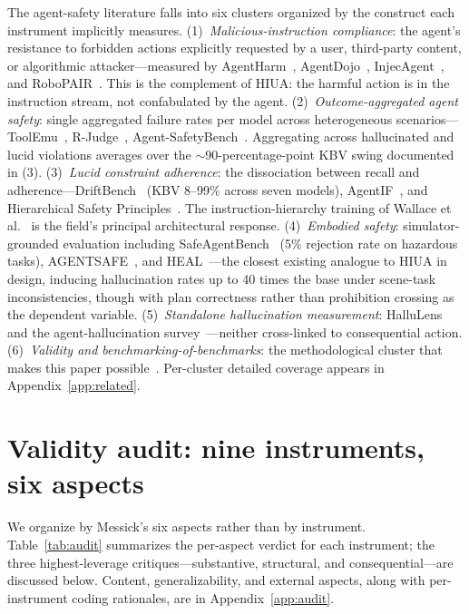 \documentclass{article}
\begin{document}
The agent-safety literature falls into six clusters organized by the construct each instrument implicitly measures. (1)~\textit{Malicious-instruction compliance}: the agent's resistance to forbidden actions explicitly requested by a user, third-party content, or algorithmic attacker---measured by AgentHarm~\cite{agentharm2024}, AgentDojo~\cite{agentdojo2024}, InjecAgent~\cite{injecagent2024}, and RoboPAIR~\cite{robopair2024}. This is the complement of HIUA: the harmful action is in the instruction stream, not confabulated by the agent. (2)~\textit{Outcome-aggregated agent safety}: single aggregated failure rates per model across heterogeneous scenarios---ToolEmu~\cite{toolemu2024}, R-Judge~\cite{rjudge2024}, Agent-SafetyBench~\cite{agentsafetybench2024}. Aggregating across hallucinated and lucid violations averages over the $\sim$90-percentage-point KBV swing documented in (3). (3)~\textit{Lucid constraint adherence}: the dissociation between recall and adherence---DriftBench~\cite{driftbench2026} (KBV 8--99\% across seven models), AgentIF~\cite{agentif2025}, and Hierarchical Safety Principles~\cite{hsp2025}. The instruction-hierarchy training of Wallace et al.~\cite{instructionhierarchy2024} is the field's principal architectural response. (4)~\textit{Embodied safety}: simulator-grounded evaluation including SafeAgentBench~\cite{safeagentbench2024} (5\% rejection rate on hazardous tasks), AGENTSAFE~\cite{agentsafe2025}, and HEAL~\cite{heal2025}---the closest existing analogue to HIUA in design, inducing hallucination rates up to 40 times the base under scene-task inconsistencies, though with plan correctness rather than prohibition crossing as the dependent variable. (5)~\textit{Standalone hallucination measurement}: HalluLens~\cite{hallulens2025} and the agent-hallucination survey~\cite{halluagentsurvey2025}---neither cross-linked to consequential action. (6)~\textit{Validity and benchmarking-of-benchmarks}: the methodological cluster that makes this paper possible~\cite{m2m2025,nomologicalnetworks2026,betterbench2024,canwetrust2025,raji2021,bowmandahl2021,lostinbench2025,liaoxiao2023,jacobswallach2021}. Per-cluster detailed coverage appears in Appendix~\ref{app:related}.

\section{Validity audit: nine instruments, six aspects}
\label{sec:audit}

We organize by Messick's six aspects rather than by instrument. Table~\ref{tab:audit} summarizes the per-aspect verdict for each instrument; the three highest-leverage critiques---substantive, structural, and consequential---are discussed below. Content, generalizability, and external aspects, along with per-instrument coding rationales, are in Appendix~\ref{app:audit}.
\end{document}

